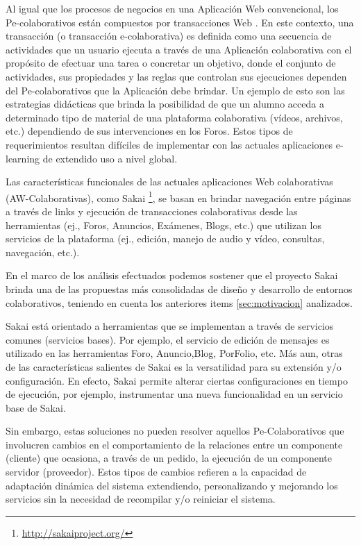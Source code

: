 {Al igual que los procesos de negocios en una Aplicación Web
convencional, los Pe-colaborativos están compuestos por transacciones Web
\cite{cacic2007.7}. En este contexto, una transacción (o transacción
e-colaborativa) es definida como una secuencia de actividades que un usuario
ejecuta a través de una Aplicación colaborativa con el propósito de efectuar una
tarea o concretar un objetivo, donde el conjunto de actividades, sus propiedades
y las reglas que controlan sus ejecuciones dependen del Pe-colaborativos que la
Aplicación debe brindar. Un ejemplo de esto son las estrategias didácticas que
brinda la posibilidad de
que un alumno acceda a determinado tipo de material de una plataforma
colaborativa  (vídeos, archivos, etc.)
dependiendo de sus intervenciones en los Foros. Estos tipos de requerimientos
resultan difíciles de implementar con las actuales aplicaciones e-learning de
extendido uso a nivel global.


Las características funcionales de las actuales aplicaciones Web
colaborativas (AW-Colaborativas), como
Sakai \footnote{\url{http://sakaiproject.org/}}, se basan en brindar
navegación entre páginas a través de links y ejecución de transacciones
colaborativas  desde las herramientas (ej., Foros, Anuncios, Exámenes, Blogs,
etc.) que utilizan los servicios de la plataforma (ej., edición, manejo de audio
y vídeo, consultas, navegación, etc.).


En el marco de los análisis efectuados podemos sostener que el proyecto Sakai
brinda una de las propuestas más consolidadas de diseño y desarrollo de
entornos colaborativos, teniendo en cuenta los anteriores items
\ref{sec:motivacion} analizados.


Sakai está orientado a herramientas que se implementan a través de servicios
comunes (servicios bases). Por ejemplo, el servicio de edición de mensajes es
utilizado en las herramientas Foro, Anuncio,Blog, PorFolio, etc. Más aun, otras
de las características salientes de Sakai es la versatilidad para su extensión
y/o configuración. En efecto, Sakai permite alterar ciertas configuraciones  en
tiempo de ejecución, por ejemplo, instrumentar una nueva funcionalidad en un
servicio base de Sakai.


Sin embargo, estas soluciones no pueden resolver aquellos Pe-Colaborativos que
involucren cambios en el comportamiento de la relaciones entre un componente
(cliente) que ocasiona, a través de un pedido, la ejecución de un componente
servidor (proveedor). Estos tipos de cambios refieren a la capacidad de
adaptación dinámica del sistema \cite{cacic2007.14} extendiendo, personalizando
y mejorando los servicios sin la necesidad de recompilar y/o reiniciar el
sistema. 


}
